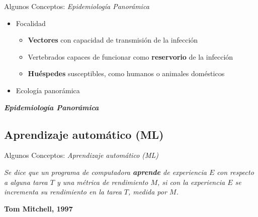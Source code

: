 \documentclass[10pt]{beamer}
\begin{document}
\begin{frame}{Algunos Conceptos: \textit{Epidemiología Panorámica}}
  \begin{itemize}
   \item Focalidad
    \begin{itemize}
      \item \textbf{Vectores} con capacidad de transmisión de la infección
      \item Vertebrados capaces de funcionar como \textbf{reservorio} de la infección
      \item \textbf{Huéspedes} susceptibles, como humanos o animales domésticos
    \end{itemize}
    \item Ecología panorámica

    \pause
  \end{itemize}
  \begin{center}
    \textbf{\textit{Epidemiología Panorámica}}
  \end{center}
\end{frame}


\subsection{Aprendizaje automático (ML)}

\begin{frame}{Algunos Conceptos: \textit{Aprendizaje automático (ML)}}
  \begin{framed}
    \begin{center}
      \textit{Se dice que un programa de computadora \textbf{aprende} de experiencia
      $E$ con respecto a alguna tarea $T$ y una métrica de rendimiento $M$, si
      con la experiencia $E$ se incrementa su rendimiento en la tarea $T$,
      medida por $M$.}\\
    \end{center}
    \centering \textbf{Tom Mitchell, 1997}
  \end{framed}

\end{frame}
\end{document}
